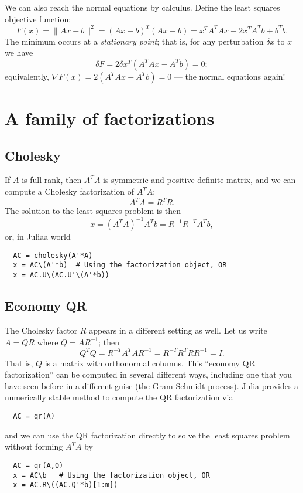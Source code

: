 \documentclass[12pt, leqno]{article}
\begin{document}
We can also reach the normal equations by calculus.  Define
the least squares objective function:
\[
  F(x) = \|Ax-b\|^2 = (Ax-b)^T (Ax-b) = x^T A^TA x - 2x^T A^T b + b^T b.
\]
The minimum occurs at a {\em stationary point}; that is,
for any perturbation $\delta x$ to $x$ we have
\[
  \delta F = 2 \delta x^T (A^T A x - A^T b) = 0;
\]
equivalently, $\nabla F(x) = 2 (A^T A x - A^T b) = 0$ ---
the normal equations again!

\section{A family of factorizations}

\subsection{Cholesky}

If $A$ is full rank, then $A^T A$ is symmetric and positive definite
matrix, and we can compute a Cholesky factorization of $A^T A$:
\[
  A^T A = R^T R.
\]
The solution to the least squares problem is then
\[
  x = (A^T A)^{-1} A^T b = R^{-1} R^{-T} A^T b,
\]
or, in Juliaa world
\begin{lstlisting}
  AC = cholesky(A'*A)
  x = AC\(A'*b)  # Using the factorization object, OR
  x = AC.U\(AC.U'\(A'*b))
\end{lstlisting}

\subsection{Economy QR}

The Cholesky factor $R$ appears in a different setting as well.
Let us write $A = QR$ where $Q = AR^{-1}$; then
\[
  Q^T Q = R^{-T} A^T A R^{-1} = R^{-T} R^T R R^{-1} = I.
\]
That is, $Q$ is a matrix with orthonormal columns.  This
``economy QR factorization'' can be computed in several different
ways, including one that you have seen before in a different guise
(the Gram-Schmidt process).  Julia provides a numerically stable
method to compute the QR factorization via
\begin{lstlisting}
  AC = qr(A)
\end{lstlisting}
and we can use the QR factorization directly to solve the least
squares problem without forming $A^T A$ by
\begin{lstlisting}
  AC = qr(A,0)
  x = AC\b   # Using the factorization object, OR
  x = AC.R\((AC.Q'*b)[1:m])
\end{lstlisting}
\end{document}
